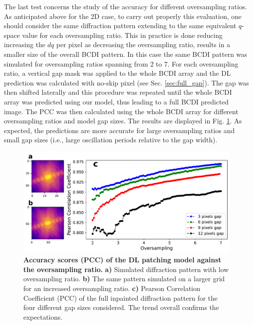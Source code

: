 The last test concerns the study of the accuracy for different oversampling ratios. As anticipated above for the 2D case, 
to carry out properly this evaluation, one should consider the same diffraction pattern extending to the same equivalent
$q$-space value for each oversampling ratio. This in practice is done reducing increasing the $dq$ per pixel as decreasing
the oversampling ratio, results in a smaller size of the overall BCDI pattern. In this case 
the same BCDI pattern was simulated for oversampling ratios spanning from 2 to 7. For each oversampling ratio, a vertical gap
mask was applied to the whole BCDI array and the DL prediction was calculated with no-skip pixel (see Sec. \ref{sec:full_gap}).
The gap was then shifted laterally and this procedure was repeated until the whole BCDI array was predicted using our
model, thus leading to a full BCDI predicted image. The PCC was then calculated using the whole BCDI array for 
different oversampling ratios and model gap sizes. The results are displayed in Fig. \ref{fig:acc_ovs_3D}. As expected,
the predictions are more accurate for large oversampling ratios and small gap sizes (i.e., large oscillation periods 
relative to the gap width). 

\begin{figure}[H]
    \centering
    \includegraphics[width=\textwidth]{figures/Inpainting/accuracy_oversampling.pdf}
    \caption{\textbf{Accuracy scores (PCC) of the DL patching model against the oversampling ratio.} \textbf{a)} Simulated 
    diffraction pattern with low oversampling ratio. \textbf{b)} The same pattern simulated on a larger grid for an  
    increased oversampling ratio. \textbf{c)} Pearson Correlation Coefficient (PCC) of the full inpainted diffraction pattern 
    for the four different gap sizes considered. The trend overall confirms the expectations. }
    \label{fig:acc_ovs_3D}
\end{figure}

